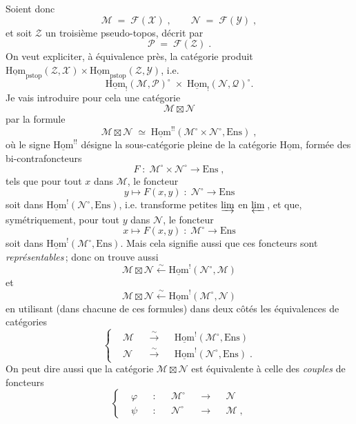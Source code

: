 \documentclass[11pt]{article}
\newcommand{\printedpage}[1]{\if\relax\detokenize{#1}\relax\else\marginpar{\footnotesize p.~#1}\fi}
\newcommand{\msp}[1]{\marginpar{\footnotesize [#1]}}
\newcommand{\uHom}{\underline{\mathrm{Hom}}}
\newcommand{\Ens}{\mathrm{Ens}}
\newcommand{\pstop}{\mathrm{pstop}}
\begin{document}
Soient donc
\[
\mathcal{M} \;=\; \mathcal{F}(\mathcal{X})\;, \qquad \mathcal{N} \;=\; \mathcal{F}(\mathcal{Y})\;,
\tag*{(4.1.6)}
\]
et soit $\mathcal{Z}$ un troisième pseudo-topos, décrit par
\[
\mathcal{P} \;=\; \mathcal{F}(\mathcal{Z})\;.
\tag*{(4.1.7)}
\]
On veut expliciter, à équivalence près, la catégorie produit $\uHom_{\pstop}(\mathcal{Z},\mathcal{X})\times\uHom_{\pstop}(\mathcal{Z},\mathcal{Y})$, i.e.
\[
\uHom_!(\mathcal{M},\mathcal{P})^\circ \;\times\; \uHom_!(\mathcal{N},\mathcal{Q})^\circ.
\tag*{(4.1.8)}
\] %
Je vais introduire pour cela une catégorie
\printedpage{3}
\msp{page 55}
\[
\mathcal{M}\boxtimes\mathcal{N}
\tag*{(4.1.9)}
\]
par la formule
\[
\mathcal{M}\boxtimes\mathcal{N} \;\simeq\; \uHom^{!!}(\mathcal{M}^\circ\times\mathcal{N}^\circ,\Ens)\;,
\tag*{(4.1.10)}
\]
où le signe $\uHom^{!!}$ désigne la sous-catégorie pleine de la catégorie $\uHom$, formée des bi-contrafoncteurs %
\[
F \;:\; \mathcal{M}^\circ\times\mathcal{N}^\circ \longrightarrow \Ens\;,
\tag*{(4.1.10.1)}
\]
tels que pour tout $x$ dans $\mathcal{M}$, le foncteur
\[
y \longmapsto F(x,y) \;:\; \mathcal{N}^\circ \longrightarrow \Ens
\tag*{(4.1.10.2)}
\]
soit dans $\uHom^!(\mathcal{N}^\circ,\Ens)$, i.e. transforme petites $\varinjlim$ en $\varprojlim$\,, et que, symétriquement, pour tout $y$ dans $\mathcal{N}$, le foncteur
\[
x \longmapsto F(x,y) \;:\; \mathcal{M}^\circ \longrightarrow \Ens
\tag*{(4.1.10.3)}
\]
soit dans $\uHom^!(\mathcal{M}^\circ,\Ens)$. Mais cela signifie aussi que ces foncteurs sont \textit{représentables}\,; donc on trouve aussi
\[
\mathcal{M}\boxtimes\mathcal{N} \xleftarrow{\sim} \uHom^!(\mathcal{N}^\circ,\mathcal{M})
\tag*{(4.1.11)}
\]
et
\[
\mathcal{M}\boxtimes\mathcal{N} \xleftarrow{\sim} \uHom^!(\mathcal{M}^\circ,\mathcal{N})
\tag*{(4.1.12)}
\]
\msp{page 56}
en utilisant (dans chacune de ces formules) dans deux côtés les équivalences de catégories
\[
\left\{
\begin{aligned}
&\mathcal{M} &&\xrightarrow{\sim} &&\uHom^!(\mathcal{M}^\circ,\Ens)\\
&\mathcal{N} &&\xrightarrow{\sim} &&\uHom^!(\mathcal{N}^\circ,\Ens)\;.
\end{aligned}
\right.
\tag*{(4.1.13)}
\]
On peut dire aussi que la catégorie $\mathcal{M}\boxtimes\mathcal{N}$ est équivalente à celle des \textit{couples} de foncteurs
\[
\left\{
\begin{aligned}
&\varphi &&: &&\mathcal{M}^\circ &&\longrightarrow &&\mathcal{N}\\
&\psi &&: &&\mathcal{N}^\circ &&\longrightarrow &&\mathcal{M}\;,
\end{aligned}
\right.
\tag*{(4.1.14)}
\]
\end{document}
